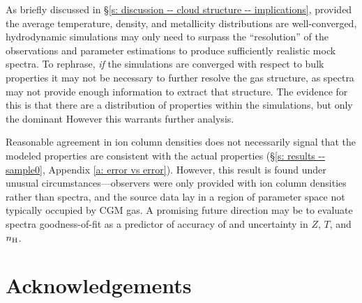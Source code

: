 \documentclass[fleqn,usenatbib]{mnras}
\begin{document}
As briefly discussed in \S\ref{s: discussion -- cloud structure -- implications},
provided the average temperature, density, and metallicity distributions are well-converged,
hydrodynamic simulations may only need to surpass the ``resolution'' of the observations and parameter estimations to produce sufficiently realistic mock spectra.
To rephrase, \textit{if} the simulations are converged with respect to bulk properties it may not be necessary to further resolve the gas structure, as spectra may not provide enough information to extract that structure.
The evidence for this is that there are a distribution of properties within the simulations, but only the dominant
However this warrants further analysis.

Reasonable agreement in ion column densities does not necessarily signal that the modeled properties are consistent with the actual properties (\S\ref{s: results -- sample0}, Appendix \ref{a: error vs error}).
However, this result is found under unusual circumstances---observers were only provided with ion column densities rather than spectra, and the source data lay in a region of parameter space not typically occupied by CGM gas.
A promising future direction may be to evaluate spectra goodness-of-fit as a predictor of accuracy of and uncertainty in $Z$, $T$, and $n_{\rm H}$.

\section*{Acknowledgements}
\end{document}
